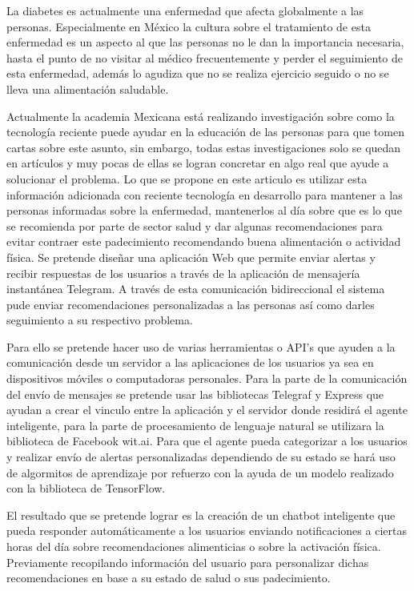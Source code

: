 La diabetes es actualmente una enfermedad que afecta globalmente a las personas. Especialmente en México la cultura sobre el tratamiento de esta enfermedad es un aspecto al que las personas no le dan la importancia necesaria, hasta el punto de no visitar al médico frecuentemente y perder el seguimiento de esta enfermedad, además lo agudiza que no se realiza ejercicio seguido o no se lleva una alimentación saludable.
\vspace{0.50cm}

Actualmente la academia Mexicana está realizando investigación sobre como la tecnología reciente puede ayudar en la educación de las personas para que tomen cartas sobre este asunto, sin embargo, todas estas investigaciones solo se quedan en artículos y muy pocas de ellas se logran concretar en algo real que ayude a solucionar el problema. Lo que se propone en este articulo es utilizar esta información adicionada con reciente tecnología en desarrollo para mantener a las personas informadas sobre la enfermedad, mantenerlos al día sobre que es lo que se recomienda por parte de sector salud y dar algunas recomendaciones para evitar contraer este padecimiento recomendando buena alimentación o actividad física. Se pretende diseñar una aplicación Web que permite enviar alertas y recibir respuestas de los usuarios a través de la aplicación de mensajería instantánea Telegram. A través de esta comunicación bidireccional el sistema pude enviar recomendaciones personalizadas a las personas así como darles seguimiento a su respectivo problema.
\vspace{0.50cm}

Para ello se pretende hacer uso de varias herramientas o API's que ayuden a la comunicación desde un servidor a las aplicaciones de los usuarios ya sea en dispositivos móviles o computadoras personales. Para la parte de la comunicación del envío de mensajes se pretende usar las bibliotecas Telegraf y Express que ayudan a crear el vinculo entre la aplicación y el servidor donde residirá el agente inteligente, para la parte de procesamiento de lenguaje natural se utilizara la biblioteca de Facebook wit.ai. Para que el agente pueda categorizar a los usuarios y realizar envío de alertas personalizadas dependiendo de su estado se hará uso de algormitos de aprendizaje por refuerzo con la ayuda de un modelo realizado con la biblioteca de  TensorFlow.
\vspace{0.50cm}


El resultado que se pretende lograr es la creación de un chatbot inteligente que pueda responder automáticamente a los usuarios enviando notificaciones a ciertas horas del día sobre recomendaciones alimenticias o sobre la activación física. Previamente recopilando información del usuario para personalizar dichas recomendaciones en base a su estado de salud o sus padecimiento.
\vspace{0.50cm}
